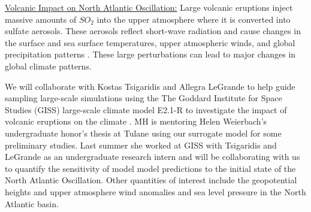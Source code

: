 \documentclass[11pt]{NSFamsart}
\begin{document}
  
\underline{Volcanic Impact on North Atlantic Oscillation:}
Large volcanic eruptions inject massive amounts of ${SO_2}$ into the upper atmosphere where it is converted into sulfate aerosols.  These aerosols reflect short-wave radiation and cause changes in the surface and sea surface temperatures, upper atmospheric winds, and  global precipitation patterns \cite{zanchettin2013background, legrande2015volcanic}.  
These large perturbations can lead to  major changes in global climate patterns.

We will collaborate with Kostas Tsigaridis and Allegra LeGrande to help guide sampling large-scale simulations using the The Goddard Institute for Space Studies (GISS) large-scale climate model E2.1-R to investigate the impact of volcanic eruptions on the climate
\cite{zanchettin2016model}.  MH is mentoring Helen Weierbach's undergraduate honor's thesis at Tulane using our surrogate model for some preliminary studies.  Last summer she worked at GISS with Tsigaridis and LeGrande as an undergraduate research intern and will be collaborating with us to quantify the sensitivity of model model predictions to the initial state of the North Atlantic Oscillation. Other quantities of interest include the geopotential heights and upper atmosphere wind anomalies and sea level pressure in the North Atlantic basin. 
\end{document}
